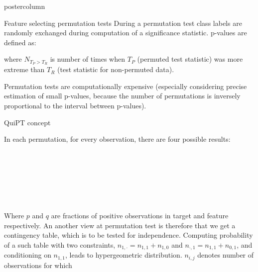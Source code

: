 \documentclass[final]{beamer}\usepackage[]{graphicx}\usepackage[]{color}
\begin{document}
\begin{frame}
\begin{columns}
\begin{column}{.47\textwidth}
\begin{beamercolorbox}[center,wd=\textwidth]{postercolumn}
\begin{minipage}[T]{.95\textwidth}
{\begin{block}{Feature selecting permutation tests}
    During a permutation test class labels are randomly exchanged during computation of a significance statistic. p-values are defined as:
    
\begin{center}
\end{center}

where $N_{T_P > T_R}$ is number of times when $T_P$ (permuted test statistic) was more extreme than $T_R$ (test statistic for non-permuted data).

Permutation tests are computationally expensive (especially considering precise estimation of small p-values, because the number of permutations is inversely proportional to the interval between p-values).
      
    \end{block}
    \vfill
    
    
\begin{block}{QuiPT concept}

In each permutation, for every observation, there are four possible results:

\begin{center}
\scalebox{0.85}{
$P(Target, Feature) = (1,1)) = p \cdot q$
}
\end{center}

\\

\begin{center}
\scalebox{0.85}{
$P(Target, Feature) = (1,0)) = p \cdot (1-q)$
}
\end{center}

\\

\begin{center}
\scalebox{0.85}{
$P(Target, Feature) = (0,1)) = (1-p) \cdot q$
}
\end{center}

\\

\begin{center}
\scalebox{0.85}{
$P(Target, Feature) = (0,0)) = (1-p) \cdot (1-q)$
}
\end{center}

\\

Where $p$ and $q$ are fractions of positive observations in target and
feature respectively. An another view at permutation test is therefore that we 
get a contingency table, which is to be tested for independence.
Computing probability of a such table with two constraints, $n_{1,\cdot} = n_{1,1} + n_{1,0}$ and
$n_{\cdot, 1} = n_{1,1} + n_{0,1}$, and 
conditioning on $n_{1,1}$, leads to hypergeometric distribution.
$n_{i,j}$ denotes number of observations for which 
\scalebox{0.85}{$(Target, Feature) = (i,j)$}


\end{block}}
\end{minipage}
\end{beamercolorbox}
\end{column}
\end{columns}
\end{frame}
\end{document}
